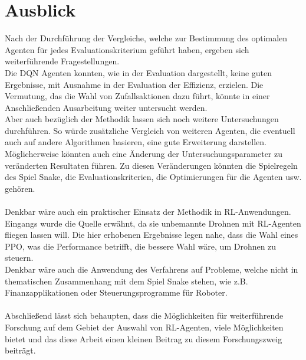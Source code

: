 \section{Ausblick}
Nach der Durchführung der Vergleiche, welche zur Bestimmung des optimalen Agenten für jedes Evaluationskriterium geführt haben, ergeben sich weiterführende Fragestellungen.\\
Die DQN Agenten konnten, wie in der Evaluation dargestellt, keine guten Ergebnisse, mit Ausnahme in der Evaluation der Effizienz, erzielen. Die Vermutung, das die Wahl von Zufallsaktionen dazu führt, könnte in einer Anschließenden Ausarbeitung weiter untersucht werden.\\
Aber auch bezüglich der Methodik lassen sich noch weitere Untersuchungen durchführen. 
So würde zusätzliche Vergleich von weiteren Agenten, die eventuell auch auf andere Algorithmen basieren, eine gute Erweiterung darstellen.\\
Möglicherweise könnten auch eine Änderung der Untersuchungsparameter zu veränderten Resultaten führen. Zu diesen Veränderungen könnten die Spielregeln des Spiel Snake, die Evaluationskriterien, die Optimierungen für die Agenten usw. gehören.\\
\\Denkbar wäre auch ein praktischer Einsatz der Methodik in RL-Anwendungen. Eingangs wurde die Quelle \cite{UAV} erwähnt, da sie unbemannte Drohnen mit RL-Agenten fliegen lassen will. Die hier erhobenen Ergebnisse legen nahe, dass die Wahl eines PPO, was die Performance betrifft, die bessere Wahl wäre, um Drohnen zu steuern.\\
Denkbar wäre auch die Anwendung des Verfahrens auf Probleme, welche nicht in thematischen Zusammenhang mit dem Spiel Snake stehen, wie z.B. Finanzapplikationen oder Steuerungsprogramme für Roboter.\\
\\Abschließend lässt sich behaupten, dass die Möglichkeiten für weiterführende Forschung auf dem Gebiet der Auswahl von RL-Agenten, viele Möglichkeiten bietet und das diese Arbeit einen kleinen Beitrag zu diesem Forschungszweig beiträgt.
